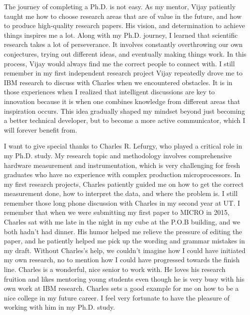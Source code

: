 \begin{acknowledgments}
The journey of completing a Ph.D. is not easy. As my mentor, Vijay patiently taught me how to choose research areas that are of value in the future, and how to produce high-quality research papers. His vision, and determination to achieve things inspires me a lot. Along with my Ph.D. journey, I learned that scientific research takes a lot of perseverance. It involves constantly overthrowing our own conjectures, trying out different ideas, and eventually making things work. In this process, Vijay would always find me the correct people to connect with. I still remember in my first independent research project Vijay repeatedly drove me to IBM research to discuss with Charles when we encountered obstacles. It is in those experiences when I realized that intelligent discussions are key to innovation because it is when one combines knowledge from different areas that inspiration occurs. This idea gradually shaped my mindset beyond just becoming a better technical developer, but to become a more active communicator, which I will forever benefit from.

I want to give special thanks to Charles R. Lefurgy, who played a critical role in my Ph.D. study. My research topic and methodology involves comprehensive hardware measurement and instrumentation, which is very challenging for fresh graduates who have no experience with complex production microprocessors. In my first research projects, Charles patiently guided me on how to get the correct measurement done, how to interpret the data, and where the problem is. I still remember those long phone discussion with Charles in my second year at UT. I remember that when we were submitting my first paper to MICRO in 2015, Charles sat with me late in the night in my cube at the P.O.B building, and we both hadn't had dinner. His humor helped me relieve the pressure of editing the paper, and he patiently helped me pick up the wording and grammar mistakes in my draft. Without Charles's help, we couldn't imagine how I could have initiated my own research, no to mention how I could have progressed towards the finish line. Charles is a wonderful, nice senior to work with. He loves his research fruition and likes mentoring young students even though he is very busy with his own work at IBM research. Charles sets a good example for me on how to be a nice college in my future career. I feel very fortunate to have the pleasure of working with him in my Ph.D. study. 


\end{acknowledgments}
